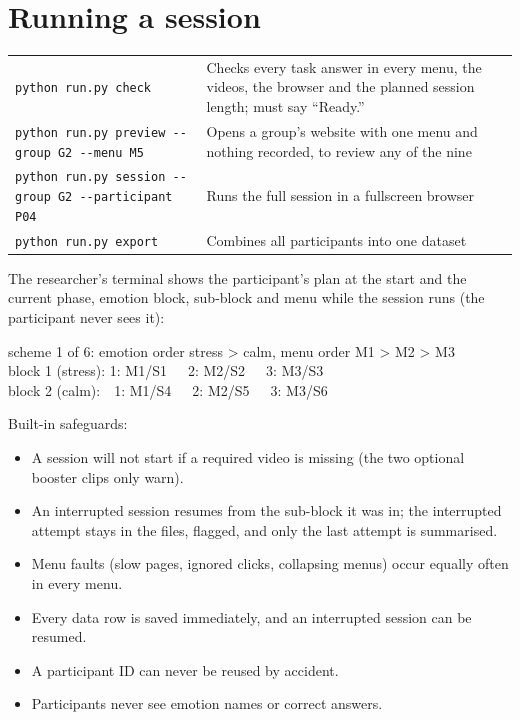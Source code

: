 \documentclass[11pt,a4paper]{article}
\newcommand{\cmd}[1]{\texttt{\small #1}}
\begin{document}
\section{Running a session}

\begin{keybox}
\begin{tabularx}{\linewidth}{@{}l L@{}}
\cmd{python run.py check} & Checks every task answer in every menu, the videos, the browser and the planned session length; must say ``Ready.''\\
\cmd{python run.py preview -{}-group G2 -{}-menu M5} & Opens a group's website with one menu and nothing recorded, to review any of the nine\\
\cmd{python run.py session -{}-group G2 -{}-participant P04} & Runs the full session in a fullscreen browser\\
\cmd{python run.py export} & Combines all participants into one dataset\\
\end{tabularx}
\end{keybox}

The researcher's terminal shows the participant's plan at the start and the current phase, emotion block, sub-block and menu while the session runs
(the participant never sees it):
\begin{center}
\begin{minipage}{0.86\linewidth}\footnotesize\ttfamily
scheme 1 of 6: emotion order stress > calm, menu order M1 > M2 > M3\\
\hspace*{1em}block 1 (stress): 1: M1/S1\ \ \ 2: M2/S2\ \ \ 3: M3/S3\\
\hspace*{1em}block 2 (calm):\ \ 1: M1/S4\ \ \ 2: M2/S5\ \ \ 3: M3/S6
\end{minipage}
\end{center}

Built-in safeguards:
\begin{itemize}
  \item A session will not start if a required video is missing (the two optional booster clips only warn).
  \item An interrupted session resumes from the sub-block it was in; the interrupted attempt stays in the files, flagged, and only the last attempt is summarised.
  \item Menu faults (slow pages, ignored clicks, collapsing menus) occur equally often in every menu.
  \item Every data row is saved immediately, and an interrupted session can be resumed.
  \item A participant ID can never be reused by accident.
  \item Participants never see emotion names or correct answers.
\end{itemize}
\end{document}
